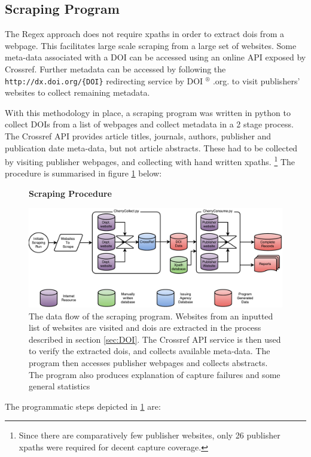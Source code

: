 \subsection{Scraping Program}
\label{sec:SCRAPING_PROGRAM}
The Regex approach does not require xpaths in order to extract dois from a webpage. This facilitates large scale scraping from a large set of websites. Some meta-data associated with a DOI can be accessed using an online API exposed by Crossref. Further metadata can be accessed by following the \texttt{http://dx.doi.org/\{DOI\}} redirecting service by DOI $^{\circledR}$ .org. to visit publishers' websites to collect remaining metadata. 

With this methodology in place, a scraping program was written in python to collect DOIs from a list of webpages and collect metadata in a 2 stage process. The Crossref API provides article titles, journals, authors, publisher and publication date meta-data, but not article abstracts. These had to be collected by visiting publisher webpages, and collecting with hand written xpaths. \footnote{Since there are comparatively few publisher websites, only 26 publisher xpaths were required for decent capture coverage.} The procedure is summarised in figure \ref{fig:Cherry} below:
\begin{figure}[H]
    \centering
    \textbf{Scraping Procedure}\par\medskip
    \includegraphics[width=\textwidth]{Data_Acquisition/Cherry.pdf}
    \caption{The data flow of the scraping program. Websites from an inputted list of websites are visited and dois are extracted in the process described in section \ref{sec:DOI}. The Crossref API service is then used to verify the extracted dois, and collects available meta-data. The program then accesses publisher webpages and collects abstracts. The program also produces explanation of capture failures and some general statistics}
     \label{fig:Cherry}
\end{figure}
The programmatic steps depicted in \ref{fig:Cherry} are:
